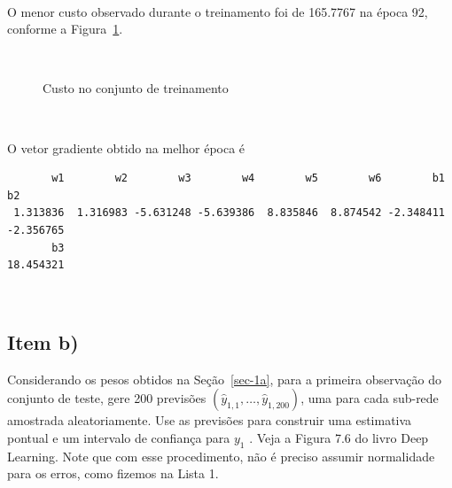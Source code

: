 \documentclass[
  a4paperpaper,
]{article}
\begin{document}
~

O menor custo observado durante o treinamento foi de 165.7767 na época
92, conforme a Figura~\ref{fig-resultadosq1}.

~

\begin{figure}[H]


\caption{\label{fig-resultadosq1}Custo no conjunto de treinamento}

\end{figure}%

~

O vetor gradiente obtido na melhor época é

\begin{verbatim}
       w1        w2        w3        w4        w5        w6        b1        b2 
 1.313836  1.316983 -5.631248 -5.639386  8.835846  8.874542 -2.348411 -2.356765 
       b3 
18.454321 
\end{verbatim}

~

\subsection{Item b)}\label{item-b}

Considerando os pesos obtidos na Seção~\ref{sec-1a}, para a primeira
observação do conjunto de teste, gere 200 previsões
\((\hat{y}_{1,1} , \dots , \hat{y}_{1,200})\), uma para cada sub-rede
amostrada aleatoriamente. Use as previsões para construir uma estimativa
pontual e um intervalo de confiança para \(y_1\) . Veja a Figura 7.6 do
livro Deep Learning. Note que com esse procedimento, não é preciso
assumir normalidade para os erros, como fizemos na Lista 1.
\end{document}

